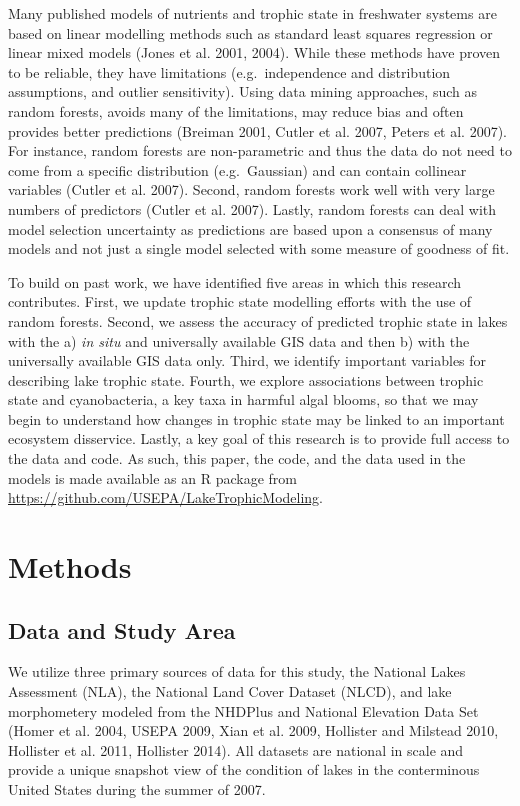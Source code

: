 \documentclass[11pt,]{article}
\begin{document}
Many published models of nutrients and trophic state in freshwater
systems are based on linear modelling methods such as standard least
squares regression or linear mixed models (Jones et al. 2001, 2004).
While these methods have proven to be reliable, they have limitations
(e.g.~independence and distribution assumptions, and outlier
sensitivity). Using data mining approaches, such as random forests,
avoids many of the limitations, may reduce bias and often provides
better predictions (Breiman 2001, Cutler et al. 2007, Peters et al.
2007). For instance, random forests are non-parametric and thus the data
do not need to come from a specific distribution (e.g.~Gaussian) and can
contain collinear variables (Cutler et al. 2007). Second, random forests
work well with very large numbers of predictors (Cutler et al. 2007).
Lastly, random forests can deal with model selection uncertainty as
predictions are based upon a consensus of many models and not just a
single model selected with some measure of goodness of fit.

To build on past work, we have identified five areas in which this
research contributes. First, we update trophic state modelling efforts
with the use of random forests. Second, we assess the accuracy of
predicted trophic state in lakes with the a) \emph{in situ} and
universally available GIS data and then b) with the universally
available GIS data only. Third, we identify important variables for
describing lake trophic state. Fourth, we explore associations between
trophic state and cyanobacteria, a key taxa in harmful algal blooms, so
that we may begin to understand how changes in trophic state may be
linked to an important ecosystem disservice. Lastly, a key goal of this
research is to provide full access to the data and code. As such, this
paper, the code, and the data used in the models is made available as an
R package from \url{https://github.com/USEPA/LakeTrophicModeling}.

\section{Methods}\label{methods}

\subsection{Data and Study Area}\label{data-and-study-area}

We utilize three primary sources of data for this study, the National
Lakes Assessment (NLA), the National Land Cover Dataset (NLCD), and lake
morphometery modeled from the NHDPlus and National Elevation Data Set
(Homer et al. 2004, USEPA 2009, Xian et al. 2009, Hollister and Milstead
2010, Hollister et al. 2011, Hollister 2014). All datasets are national
in scale and provide a unique snapshot view of the condition of lakes in
the conterminous United States during the summer of 2007.
\end{document}
